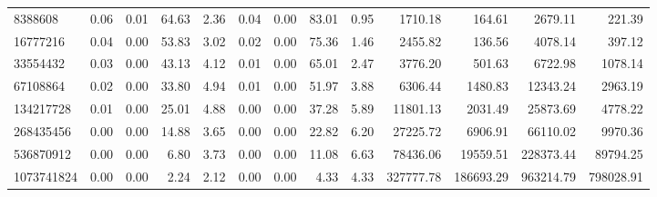 \begin{tabular}{lrrrrrrrrrrrr}
8388608 & 0.06 & 0.01 & 64.63 & 2.36 & 0.04 & 0.00 & 83.01 & 0.95 & 1710.18 & 164.61 & 2679.11 & 221.39 \\
16777216 & 0.04 & 0.00 & 53.83 & 3.02 & 0.02 & 0.00 & 75.36 & 1.46 & 2455.82 & 136.56 & 4078.14 & 397.12 \\
33554432 & 0.03 & 0.00 & 43.13 & 4.12 & 0.01 & 0.00 & 65.01 & 2.47 & 3776.20 & 501.63 & 6722.98 & 1078.14 \\
67108864 & 0.02 & 0.00 & 33.80 & 4.94 & 0.01 & 0.00 & 51.97 & 3.88 & 6306.44 & 1480.83 & 12343.24 & 2963.19 \\
134217728 & 0.01 & 0.00 & 25.01 & 4.88 & 0.00 & 0.00 & 37.28 & 5.89 & 11801.13 & 2031.49 & 25873.69 & 4778.22 \\
268435456 & 0.00 & 0.00 & 14.88 & 3.65 & 0.00 & 0.00 & 22.82 & 6.20 & 27225.72 & 6906.91 & 66110.02 & 9970.36 \\
536870912 & 0.00 & 0.00 & 6.80 & 3.73 & 0.00 & 0.00 & 11.08 & 6.63 & 78436.06 & 19559.51 & 228373.44 & 89794.25 \\
1073741824 & 0.00 & 0.00 & 2.24 & 2.12 & 0.00 & 0.00 & 4.33 & 4.33 & 327777.78 & 186693.29 & 963214.79 & 798028.91 \\
\bottomrule
\end{tabular}
